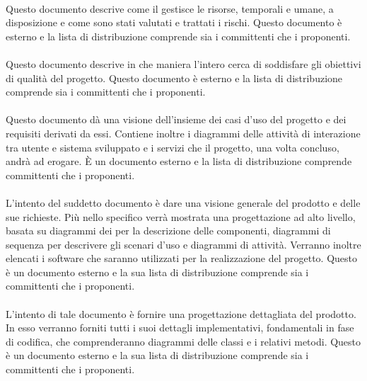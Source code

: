 \paragraph{\PdP}
Questo documento descrive come il  gestisce le risorse, temporali e umane, a disposizione e come sono stati valutati e trattati i rischi. Questo documento è esterno e la lista di distribuzione comprende sia i committenti che i proponenti.

\paragraph{\PdQ}
Questo documento descrive in che maniera l'intero  cerca di soddisfare gli obiettivi di qualità del progetto. Questo documento è esterno e la lista di distribuzione comprende sia i committenti che i proponenti.

\paragraph{\AdR}
Questo documento dà una visione dell'insieme dei casi d'uso del progetto e dei requisiti derivati da essi. Contiene inoltre i diagrammi delle attività di interazione tra utente e sistema sviluppato e i servizi che il progetto, una volta concluso, andrà ad erogare. È un documento esterno e la lista di distribuzione comprende committenti che i proponenti.

\paragraph{\studioDiFattibilita}
L'intento del suddetto documento è dare una visione generale del prodotto e delle sue richieste. Più nello specifico verrà mostrata una progettazione ad alto livello, basata su diagrammi dei  per la descrizione delle componenti, diagrammi di sequenza per descrivere gli scenari d'uso e diagrammi di attività. Verranno inoltre elencati i software che saranno utilizzati per la realizzazione del progetto. Questo è un documento esterno e la sua lista di distribuzione comprende  sia i committenti che i proponenti.

\paragraph{\DDP}
L'intento di tale documento è fornire una progettazione dettagliata del
prodotto. In esso verranno forniti tutti i suoi dettagli implementativi, fondamentali in fase di codifica, che comprenderanno diagrammi  delle classi e i relativi metodi. Questo è un documento esterno e la sua lista di distribuzione comprende  sia i committenti che i proponenti.

